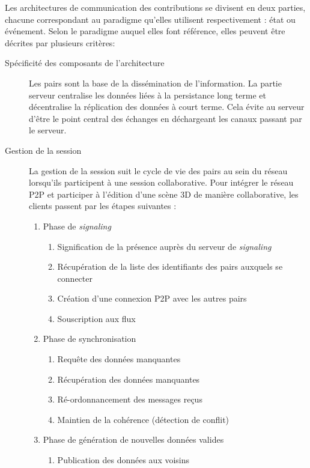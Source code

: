 Les architectures de communication des contributions se divisent en deux parties, 
chacune correspondant au paradigme qu'elles utilisent respectivement : état ou 
événement. Selon le paradigme auquel elles font référence, elles peuvent 
être décrites par plusieurs critères:
\begin{description}
	\item[Spécificité des composants de l'architecture] Les pairs sont la base de la 
	dissémination de l'information. La partie serveur 
	centralise les données liées à la persistance long  terme et
	décentralise la réplication des données à court terme. Cela évite au 
	serveur 
	d'être le point central des échanges en déchargeant les canaux passant par le 
	serveur.
	\item [Gestion de la session] 
	La gestion de la session suit le cycle de vie des pairs au sein du réseau 
	lorsqu'ils participent à une session collaborative. 
	Pour intégrer le réseau \gls{P2P} et participer à l'édition d'une scène \gls{3D} de 
	manière collaborative, les clients passent par les étapes suivantes :
		\begin{enumerate}
		\item Phase de \textit{signaling}
		\label{phase1signaling}
		\begin{enumerate}
			\item Signification de la présence auprès du serveur de \textit{signaling}
			\item Récupération de la liste des identifiants des pairs auxquels se 
			connecter
			\item Création d'une connexion \gls{P2P} avec les autres pairs
			\item Souscription aux flux
			
		\end{enumerate}
		\item Phase de synchronisation
		\label{phase2sync}
		\begin{enumerate}
			\item Requête des données manquantes
			\item Récupération des données manquantes
			\item Ré-ordonnancement des messages reçus
			\item Maintien de la cohérence (détection de conflit)
		\end{enumerate}
		
		\item Phase de génération de nouvelles données valides 
		\label{phase3gen}
		\begin{enumerate}
			\item Publication des données aux voisins
		\end{enumerate}
		

\end{enumerate}
\end{description}
